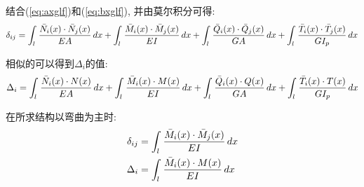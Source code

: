 结合(\ref{eq:axglf})和(\ref{eq:bxglf}), 并由莫尔积分可得:
\begin{equation}
    \label{eq:deltaij}
    \delta_{ij} = \int_l\,{{\bar N}_i(x)\cdot{\bar N}_j(x)\over EA}\,dx +%
    \int_l\,{{\bar M}_i(x)\cdot{\bar M}_j(x)\over EI}\,dx +%
    \int_l\,{{\bar Q}_i(x)\cdot{\bar Q}_j(x)\over GA}\,dx +%
    \int_l\,{{\bar T}_i(x)\cdot{\bar T}_j(x)\over GI_p}\,dx
\end{equation}

相似的可以得到$\Delta_i$的值:
\begin{equation}
    \label{eq:Deltai}
    \Delta_{i} = \int_l\,{{\bar N}_i(x)\cdot{N}(x)\over EA}\,dx +%
    \int_l\,{{\bar M}_i(x)\cdot{M}(x)\over EI}\,dx +%
    \int_l\,{{\bar Q}_i(x)\cdot{Q}(x)\over GA}\,dx +%
    \int_l\,{{\bar T}_i(x)\cdot{T}(x)\over GI_p}\,dx
\end{equation}

在所求结构{\imp 以弯曲为主}时:
\begin{align}
    \delta_{ij} &= \int_l\,{{\bar M}_i(x)\cdot{\bar M}_j(x)\over EI}\,dx\\
    \Delta_{i} &= \int_l\,{{\bar M}_i(x)\cdot{M}(x)\over EI}\,dx
\end{align}

